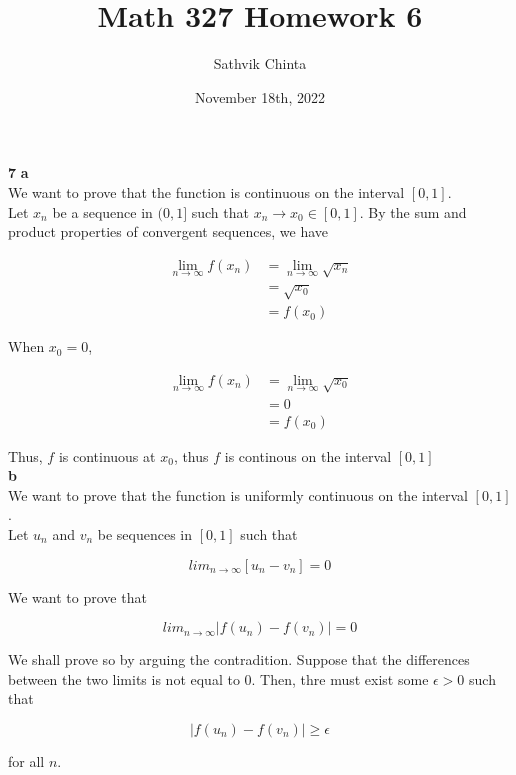 \documentclass[addpoints]{exam}
\title{Math 327 Homework 6}
\author{Sathvik Chinta}
\date{November 18th, 2022}
\begin{document}
\maketitle

\begin{questions}
\question \textbf{7} \textbf{a}\\

We want to prove that the function is continuous on the interval $[0,1]$.\\

Let ${x_n}$ be a sequence in $(0,1]$ such that $x_n \to x_0 \in [0, 1]$. By the sum and product properties of convergent
sequences, we have

\begin{align*}
\lim_{n \to \infty} f(x_n) &= \lim_{n \to \infty} \sqrt{x_n}\\
&= \sqrt{x_0} \\ 
&= f(x_0)
\end{align*}

When $x_0 = 0$, 

\begin{align*}
    \lim_{n \to \infty} f(x_n) &= \lim_{n \to \infty} \sqrt{x_0}\\
    &= 0 \\
    &= f(x_0)
\end{align*}

Thus, $f$ is continuous at $x_0$, thus $f$ is continous on the interval $[0, 1]$\\



\textbf{b}\\

We want to prove that the function is uniformly continuous on the interval $[0,1]$.\\

Let ${u_n}$ and ${v_n}$ be sequences in $[0, 1]$ such that

\[lim_{n \to \infty} [u_n - v_n] = 0\]

We want to prove that 

\[lim_{n \to \infty} |f(u_n) - f(v_n)| = 0\]

We shall prove so by arguing the contradition. Suppose that the differences between the two limits is not equal
to 0. Then, thre must exist some $\epsilon > 0$ such that

\[|f(u_n) - f(v_n)| \geq \epsilon\]

for all $n$.\\


\end{questions}
\end{document}
